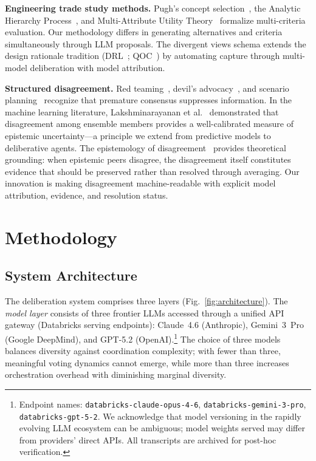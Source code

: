 \documentclass[11pt,a4paper]{article}
\begin{document}
\textbf{Engineering trade study methods.} Pugh's concept selection~\cite{pugh1991total}, the Analytic Hierarchy Process~\cite{saaty1980ahp}, and Multi-Attribute Utility Theory~\cite{keeney1976decisions} formalize multi-criteria evaluation. Our methodology differs in generating alternatives and criteria simultaneously through LLM proposals. The divergent views schema extends the design rationale tradition (DRL~\cite{lee1991drl}; QOC~\cite{maclean1991qoc}) by automating capture through multi-model deliberation with model attribution.

\textbf{Structured disagreement.} Red teaming~\cite{zenko2015red}, devil's advocacy~\cite{schwenk1990effects}, and scenario planning~\cite{schwartz1996art} recognize that premature consensus suppresses information. In the machine learning literature, Lakshminarayanan et al.~\cite{lakshminarayanan2017simple} demonstrated that disagreement among ensemble members provides a well-calibrated measure of epistemic uncertainty---a principle we extend from predictive models to deliberative agents. The epistemology of disagreement~\cite{christensen2013epistemology} provides theoretical grounding: when epistemic peers disagree, the disagreement itself constitutes evidence that should be preserved rather than resolved through averaging. Our innovation is making disagreement machine-readable with explicit model attribution, evidence, and resolution status.

\section{Methodology}
\label{sec:methodology}

\subsection{System Architecture}
\label{sec:architecture}

The deliberation system comprises three layers (Fig.~\ref{fig:architecture}). The \emph{model layer} consists of three frontier LLMs accessed through a unified API gateway (Databricks serving endpoints): Claude~4.6 (Anthropic), Gemini~3~Pro (Google DeepMind), and GPT-5.2 (OpenAI).\footnote{Endpoint names: \texttt{databricks-claude-opus-4-6}, \texttt{databricks-gemini-3-pro}, \texttt{databricks-gpt-5-2}. We acknowledge that model versioning in the rapidly evolving LLM ecosystem can be ambiguous; model weights served may differ from providers' direct APIs. All transcripts are archived for post-hoc verification.} The choice of three models balances diversity against coordination complexity; with fewer than three, meaningful voting dynamics cannot emerge, while more than three increases orchestration overhead with diminishing marginal diversity.
\end{document}
